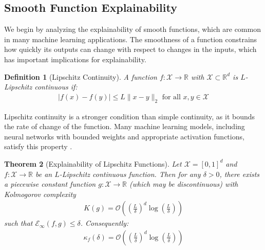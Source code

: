 \documentclass[11pt,letter,leqno]{article}
\newtheorem{theorem}{Theorem}[section]
\newtheorem{definition}[theorem]{Definition}
\begin{document}
\subsection{Smooth Function Explainability}
\label{subsec:smooth-functions}

We begin by analyzing the explainability of smooth functions, which are common in many machine learning applications.  The smoothness of a function constrains how quickly its outputs can change with respect to changes in the inputs, which has important implications for explainability.

\begin{definition}[Lipschitz Continuity]
\label{def:lipschitz}
A function $f: \mathcal{X} \rightarrow \mathbb{R}$ with $\mathcal{X} \subset \mathbb{R}^d$ is $L$-Lipschitz continuous if:
\begin{align}
|f(x) - f(y)| \leq L \|x - y\|_2 \text{ for all } x, y \in \mathcal{X}
\end{align}
\end{definition}

Lipschitz continuity is a stronger condition than simple continuity, as it bounds the rate of change of the function.  Many machine learning models, including neural networks with bounded weights and appropriate activation functions, satisfy this property \cite{Bartlett2017, Gouk2021}.


\begin{theorem}[Explainability of Lipschitz Functions]
\label{thm:lipschitz-explainability}
Let $\mathcal{X} = [0, 1]^d$ and $f: \mathcal{X} \rightarrow \mathbb{R}$ be an $L$-Lipschitz continuous function. Then for any $\delta > 0$, there exists a piecewise constant function $g: \mathcal{X} \to \mathbb{R}$ (which may be discontinuous) with Kolmogorov complexity
\begin{align}
K(g) = \mathcal{O}\left(\left(\frac{L}{\delta}\right)^d \log\left(\frac{L}{\delta}\right)\right)
\end{align}
such that $\mathcal{E}_{\infty}(f, g) \leq \delta$. Consequently:
\begin{align}
\kappa_f(\delta) = \mathcal{O}\left(\left(\frac{L}{\delta}\right)^d \log\left(\frac{L}{\delta}\right)\right)
\end{align}
\end{theorem}
\end{document}
